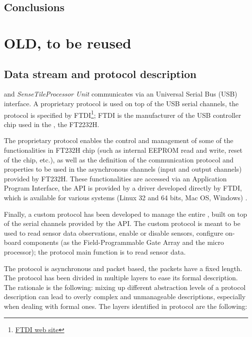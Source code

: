 \documentclass{article} \usepackage{times}
\newcommand{\myhref}[2]{\ifpdf\href{#1}{#2}\else\htmladdnormallinkfoot{#2}{#1}\fi}
\newcommand{\ST}{\emph{SenseTile}\xspace}
\newcommand{\STPU}{\ST \emph{Processor Unit}\xspace}
\begin{document}
\section{Conclusions}
\label{sec:conclusions}










\chapter{OLD, to be reused}



\section{Data stream and protocol description}
\label{sec:data_stream_and_protocol_description}

\STSB and \STPU communicates via an Universal Serial Bus (USB)
interface.  A proprietary protocol is used on top of the USB serial
channels, the protocol is specified by
FTDI\footnote{\myhref{http://www.ftdichip.com/}{FTDI web site}}; FTDI
is the manufacturer of the USB controller chip used in the \STSB, the
FT2232H\cite{ftdi_ft232h_2009}.

The proprietary protocol enables the control and management of some of
the functionalities in FT232H chip (such as internal EEPROM read and
write, reset of the chip, etc.), as well as the definition of the
communication protocol and properties to be used in the asynchronous
channels (input and output channels) provided by FT232H.  These
functionalities are accessed via an Application Program Interface, the
API is provided by a driver developed directly by FTDI, which is
available for various systems (Linux 32 and 64 bits, Mac OS, Windows)
\cite{ftdi_d2xx_api_2009}.

Finally, a custom protocol has been developed to manage the entire
\STSB, built on top of the serial channels provided by the API.  The
custom protocol is meant to be used to read sensor data observations,
enable or disable sensors, configure on-board components (as the
Field-Programmable Gate Array and the micro processor); the protocol
main function is to read sensor data.

The protocol is asynchronous and packet based, the packets have a
fixed length.  The protocol has been divided in multiple layers to
ease its formal description.  The rationale is the following: mixing
up different abstraction levels of a protocol description can lead to
overly complex and unmanageable descriptions, especially when dealing
with formal ones.  The layers identified in protocol are the
following:
\end{document}
